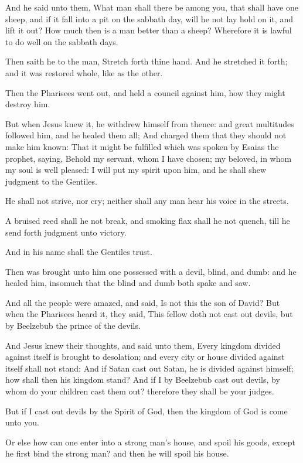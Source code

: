 \verse And he said unto them, What man shall there be among you, that shall have one sheep, and if it fall into a pit on the sabbath day, will he not lay hold on it, and lift it out?  \verse How much then is a man better than a sheep? Wherefore it is lawful to do well on the sabbath days.

\verse Then saith he to the man, Stretch forth thine hand. And he stretched it forth; and it was restored whole, like as the other.

\verse Then the Pharisees went out, and held a council against him, how they might destroy him.

\verse But when Jesus knew it, he withdrew himself from thence: and great multitudes followed him, and he healed them all; \verse And charged them that they should not make him known: \verse That it might be fulfilled which was spoken by Esaias the prophet, saying, \verse Behold my servant, whom I have chosen; my beloved, in whom my soul is well pleased: I will put my spirit upon him, and he shall shew judgment to the Gentiles.

\verse He shall not strive, nor cry; neither shall any man hear his voice in the streets.

\verse A bruised reed shall he not break, and smoking flax shall he not quench, till he send forth judgment unto victory.

\verse And in his name shall the Gentiles trust.

\verse Then was brought unto him one possessed with a devil, blind, and dumb: and he healed him, insomuch that the blind and dumb both spake and saw.

\verse And all the people were amazed, and said, Is not this the son of David?  \verse But when the Pharisees heard it, they said, This fellow doth not cast out devils, but by Beelzebub the prince of the devils.

\verse And Jesus knew their thoughts, and said unto them, Every kingdom divided against itself is brought to desolation; and every city or house divided against itself shall not stand: \verse And if Satan cast out Satan, he is divided against himself; how shall then his kingdom stand?  \verse And if I by Beelzebub cast out devils, by whom do your children cast them out? therefore they shall be your judges.

\verse But if I cast out devils by the Spirit of God, then the kingdom of God is come unto you.

\verse Or else how can one enter into a strong man's house, and spoil his goods, except he first bind the strong man? and then he will spoil his house.

